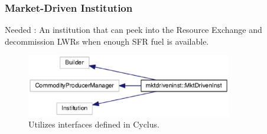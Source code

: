 \begin{frame}[fragile]
\frametitle{Market-Driven Institution}
Needed : An institution that can peek into the Resource Exchange and decommission LWRs when enough SFR fuel is available.
\begin{figure}[htbp!]
\begin{center}
\includegraphics[width=0.8\textwidth]{mdi_inherit}
\end{center}
\caption{Utilizes interfaces defined in Cyclus.}
\label{fig:mdi_inherit}
\end{figure}
\end{frame}


